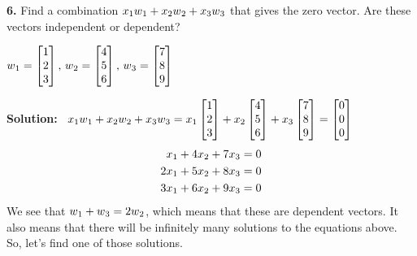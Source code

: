 \documentclass{article}
\begin{document}
\textbf{6.} Find a combination $x\textsubscript{1}w\textsubscript{1} + x\textsubscript{2}w\textsubscript{2}+x\textsubscript{3}w\textsubscript{3}$ that gives the zero vector. Are these vectors independent or dependent?
\begin{center}
$w\textsubscript{1} =
\left[
\begin{matrix}
1 \\
2\\
3
\end{matrix}
\right],\,
w\textsubscript{2} =
\left[
\begin{matrix}
4 \\
5\\
6
\end{matrix}
\right],\,
w\textsubscript{3} =
\left[
\begin{matrix}
7 \\
8\\
9
\end{matrix}
\right]
$\\
\end{center}
\textbf{Solution:} \, $x\textsubscript{1}w\textsubscript{1} + x\textsubscript{2}w\textsubscript{2}+x\textsubscript{3}w\textsubscript{3} = x\textsubscript{1}\left[
\begin{matrix}
1 \\
2\\
3
\end{matrix}
\right] + x\textsubscript{2}\left[
\begin{matrix}
4 \\
5\\
6
\end{matrix}
\right] +x\textsubscript{3} \left[
\begin{matrix}
7 \\
8\\
9
\end{matrix}
\right]= \left[
\begin{matrix}
0 \\
0\\
0
\end{matrix}
\right]\\
$
\begin{align}
x\textsubscript{1}+4x\textsubscript{2}+7x\textsubscript{3}=0\\
2x\textsubscript{1}+5x\textsubscript{2}+8x\textsubscript{3}=0\\
3x\textsubscript{1}+6x\textsubscript{2}+9x\textsubscript{3}=0
\end{align}
We see that $w\textsubscript{1}+w\textsubscript{3} = 2w\textsubscript{2}$, which means that these are dependent vectors. It also means that there will be infinitely many solutions to the equations above. So, let's find one of those solutions. \\
\end{document}
